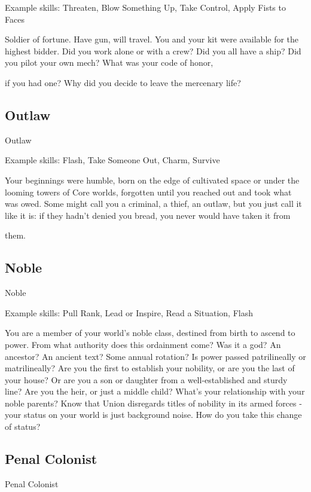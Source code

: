 Example skills: Threaten, Blow Something Up, Take Control, Apply Fists to Faces

Soldier of fortune. Have gun, will travel. You and your kit were available for the highest bidder. Did you work
alone or with a crew? Did you all have a ship? Did you pilot your own mech? What was your code of honor,

if you had one? Why did you decide to leave the mercenary life?

\subsection{Outlaw}
                                                       Outlaw

Example skills: Flash, Take Someone Out, Charm, Survive

Your beginnings were humble, born on the edge of cultivated space or under the looming towers of Core
worlds, forgotten until you reached out and took what was owed. Some might call you a criminal, a thief, an
outlaw, but you just call it like it is: if they hadn’t denied you bread, you never would have taken it from

them.

\subsection{Noble}
                                                        Noble

Example skills: Pull Rank, Lead or Inspire, Read a Situation, Flash

You are a member of your world’s noble class, destined from birth to ascend to power. From what authority
does this ordainment come? Was it a god? An ancestor? An ancient text? Some annual rotation? Is power passed patrilineally or matrilineally? Are you the first to establish your nobility, or are you the last of your
house? Or are you a son or daughter from a well-established and sturdy line? Are you the heir, or just a middle child? What’s your relationship with your noble parents? Know that Union disregards titles of nobility in its armed forces - your status on your world is just background noise. How do you take this
change of status?

\subsection{Penal Colonist}

                                                 Penal Colonist

